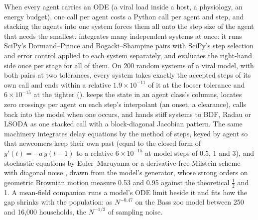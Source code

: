 When every agent carries an ODE (a viral load inside a host, a physiology, an energy budget),
one  call per agent costs a Python call per agent and step, and stacking the
agents into one system forces them all onto the step size of the agent that needs the
smallest.  integrates many independent systems at once: it runs SciPy's
Dormand--Prince and Bogacki--Shampine pairs \citep{virtanen2020scipy, dormand1980family,
bogacki1989pair} with SciPy's step selection and error control applied to each system
separately, and evaluates the right-hand side once per stage for all of them. On 200 random
systems of a viral model, with both pairs at two tolerances, every system takes exactly the
accepted steps of its own  call and ends within a relative $1.9 \times 10^{-11}$ of
it at the looser tolerance and $6 \times 10^{-15}$ at the tighter ().
 keeps the state in an agent class's columns, locates zero crossings per agent
on each step's interpolant (an onset, a clearance), calls back into the model when one occurs,
and hands stiff systems to BDF, Radau or LSODA as one stacked call with a block-diagonal
Jacobian pattern. The same machinery integrates delay equations by the method of steps, keyed
by agent so that newcomers keep their own past (equal to the closed form of
$y'(t) = -a\,y(t-1)$ to a relative $6 \times 10^{-15}$ at model steps of 0.5, 1 and 3), and
stochastic equations by Euler--Maruyama or a derivative-free Milstein scheme with diagonal noise
\citep{kloeden1992numerical}, drawn from the model's generator, whose strong orders on
geometric Brownian motion measure 0.53 and 0.95 against the theoretical $\tfrac12$ and 1. A
mean-field companion runs a model's ODE limit beside it and fits how the gap shrinks with the
population: as $N^{-0.47}$ on the Bass zoo model between 250 and 16,000 households, the
$N^{-1/2}$ of sampling noise.

